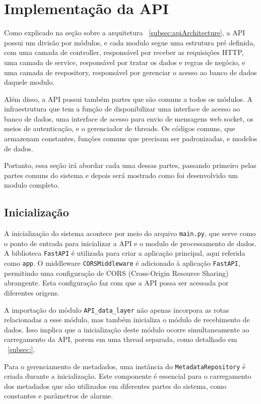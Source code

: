 \section[Implementação da API]{Implementação da API}\label{sec:api}
Como explicado na seção sobre a arquitetura ~\ref{subsec:apiArchitecture}, a \gls{API} possui um divisão por módulos, e cada modulo segue uma estrutura pré definida, com uma camada de controller, responsável por receber as requisições \gls{HTTP}, uma camada de service, responsável por tratar os dados e regras de negócio, e uma camada de respository, responsável por gerenciar o acesso ao banco de dados daquele modulo. 

Além disso, a \gls{API} possui também partes que são comuns a todos os módulos. A infraestrutura que tem a função de disponibilizar uma interface de acesso ao banco de dados, uma interface de acesso para envio de mensagens web socket, os meios de autenticação, e o gerenciador de threads. Os códigos comuns, que armazenam constantes, funções comuns que precisam ser padronizadas, e modelos de dados.

Portanto, essa seção irá abordar cada uma dessas partes, passando primeiro pelas partes comuns do sistema e depois será mostrado como foi desenvolvido um modulo completo.

\subsection{Inicialização}\label{subsec:main}
A inicialização do sistema acontece por meio do arquivo \texttt{main.py}, que serve como o ponto de entrada para inicializar a \gls{API} e o modulo de processamento de dados.
A biblioteca \texttt{FastAPI} é utilizada para criar a aplicação principal, aqui referida como \texttt{app}. O middleware \texttt{CORSMiddleware} é adicionado à aplicação \texttt{FastAPI}, permitindo uma configuração de \gls{CORS} (Cross-Origin Resource Sharing) abrangente. Esta configuração faz com que a \gls{API} possa ser acessada por diferentes origens.

A importação do módulo \texttt{API\_data\_layer} não apenas incorpora as rotas relacionadas a esse módulo, mas também inicializa o módulo de recebimento de dados. Isso implica que a inicialização deste módulo ocorre simultaneamente ao carregamento da \gls{API}, porem em uma thread separada, como detalhado em ~\ref{subsec:}.%

Para o gerenciamento de metadados, uma instância do \texttt{MetadataRepository} é criada durante a inicialização. Este componente é essencial para o carregamento dos metadados que são utilizados em diferentes partes do sistema, como constantes e parâmetros de alarme.

